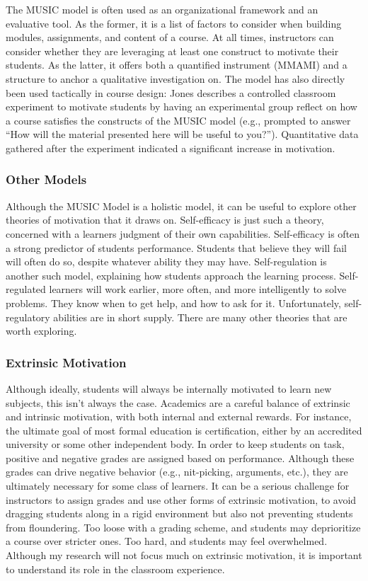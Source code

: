 The MUSIC model is often used as an organizational framework and an evaluative tool.
As the former, it is a list of factors to consider when building modules, assignments, and content of a course.
At all times, instructors can consider whether they are leveraging at least one construct to motivate their students.
As the latter, it offers both a quantified instrument (MMAMI) and a structure to anchor a qualitative investigation on.
The model has also directly been used tactically in course design: Jones describes a controlled classroom experiment to motivate students by having an experimental group reflect on how a course satisfies the constructs of the MUSIC model (e.g., prompted to answer ``How will the material presented here will be useful to you?'').
Quantitative data gathered after the experiment indicated a significant increase in motivation.~\cite{mcginley2014brief}

\subsubsection{Other Models}

Although the MUSIC Model is a holistic model, it can be useful to explore other theories of motivation that it draws on.
Self-efficacy is just such a theory, concerned with a learners judgment of their own capabilities.
Self-efficacy is often a strong predictor of students performance.
Students that believe they will fail will often do so, despite whatever ability they may have.
Self-regulation is another such model, explaining how students approach the learning process.
Self-regulated learners will work earlier, more often, and more intelligently to solve problems.
They know when to get help, and how to ask for it.
Unfortunately, self-regulatory abilities are in short supply.
There are many other theories that are worth exploring.

\subsubsection{Extrinsic Motivation}

Although ideally, students will always be internally motivated to learn new subjects, this isn't always the case.
Academics are a careful balance of extrinsic and intrinsic motivation, with both internal and external rewards.
For instance, the ultimate goal of most formal education is certification, either by an accredited university or some other independent body.
In order to keep students on task, positive and negative grades are assigned based on performance.
Although these grades can drive negative behavior (e.g., nit-picking, arguments, etc.), they are ultimately necessary for some class of learners.
It can be a serious challenge for instructors to assign grades and use other forms of extrinsic motivation, to avoid dragging students along in a rigid environment but also not preventing students from floundering.
Too loose with a grading scheme, and students may deprioritize a course over stricter ones.
Too hard, and students may feel overwhelmed.
Although my research will not focus much on extrinsic motivation, it is important to understand its role in the classroom experience.